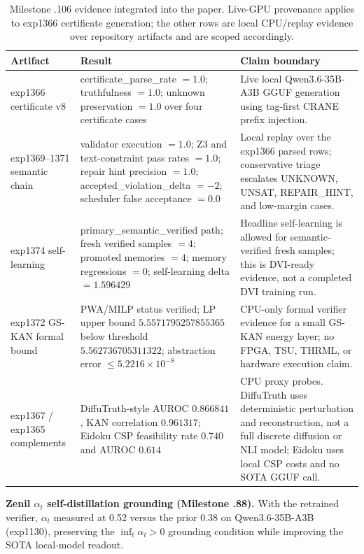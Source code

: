 \documentclass[10pt]{article}
\begin{document}
\begin{table}[ht]
  \centering
  \small
  \caption{Milestone .106 evidence integrated into the paper.
  Live-GPU provenance applies to exp1366 certificate generation;
  the other rows are local CPU/replay evidence over repository
  artifacts and are scoped accordingly.}
  \label{tab:m106-closeout}
  \begin{tabular}{p{2.7cm} p{4.8cm} p{5.9cm}}
    \toprule
    Artifact & Result & Claim boundary \\
    \midrule
    exp1366 certificate v8 &
      certificate\_parse\_rate $=1.0$; truthfulness $=1.0$;
      unknown preservation $=1.0$ over four certificate cases &
      Live local Qwen3.6-35B-A3B GGUF generation using tag-first
      CRANE prefix injection. \\
    exp1369--1371 semantic chain &
      validator execution $=1.0$; Z3 and text-constraint pass
      rates $=1.0$; repair hint precision $=1.0$;
      accepted\_violation\_delta $=-2$; scheduler false acceptance
      $=0.0$ &
      Local replay over the exp1366 parsed rows; conservative
      triage escalates UNKNOWN, UNSAT, REPAIR\_HINT, and low-margin
      cases. \\
    exp1374 self-learning &
      primary\_semantic\_verified path; fresh verified samples
      $=4$; promoted memories $=4$; memory regressions $=0$;
      self-learning delta $=1.596429$ &
      Headline self-learning is allowed for semantic-verified fresh
      samples; this is DVI-ready evidence, not a completed DVI
      training run. \\
    exp1372 GS-KAN formal bound &
      PWA/MILP status verified; LP upper bound $5.5571795257855365$
      below threshold $5.562736705311322$; abstraction error
      $\leq 5.2216\times10^{-8}$ &
      CPU-only formal verifier evidence for a small GS-KAN energy
      layer; no FPGA, TSU, THRML, or hardware execution claim. \\
    exp1367 / exp1365 complements &
      DiffuTruth-style AUROC $0.866841$, KAN correlation $0.961317$;
      Eidoku CSP feasibility rate $0.740$ and AUROC $0.614$ &
      CPU proxy probes. DiffuTruth uses deterministic perturbation
      and reconstruction, not a full discrete diffusion or NLI
      model; Eidoku uses local CSP costs and no SOTA GGUF call. \\
    \bottomrule
  \end{tabular}
\end{table}

\textbf{Zenil $\alpha_t$ self-distillation grounding (Milestone .88).}
With the retrained verifier, $\alpha_t$ measured at 0.52 versus the
prior 0.38 on Qwen3.6-35B-A3B (exp1130), preserving the
$\inf_t \alpha_t > 0$ grounding condition while improving the SOTA
local-model readout.
\end{document}
